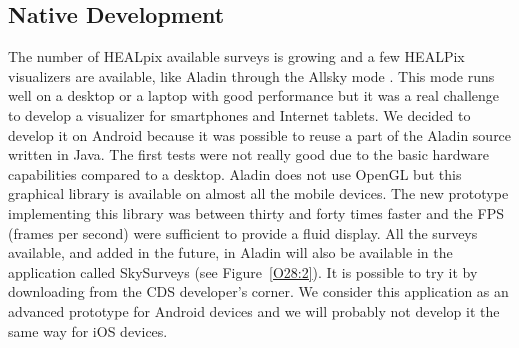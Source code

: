 \subsection{Native Development}
The number of HEALpix \citep{gorski_2005} available surveys is growing and a few HEALPix visualizers are available, like Aladin through the Allsky mode \citep{fernique_2010}. This mode runs well on a desktop or a laptop with good performance but it was a real challenge to develop a visualizer for smartphones and Internet tablets. We decided to develop it on Android because it was possible to reuse a part of the Aladin source written in Java. The first tests were not really good due to the basic hardware capabilities compared to a desktop. Aladin does not use OpenGL but this graphical library is available on almost all the mobile devices. The new prototype implementing this library was between thirty and forty times faster and the FPS (frames per second) were sufficient to provide a fluid display. All the surveys available, and added in the future, in Aladin will also be available in the application called SkySurveys (see Figure~\ref{O28:2}). It is possible to try it by downloading from the CDS developer's corner. We consider this application as an advanced prototype for Android devices and we will probably not develop it the same way for iOS devices.

